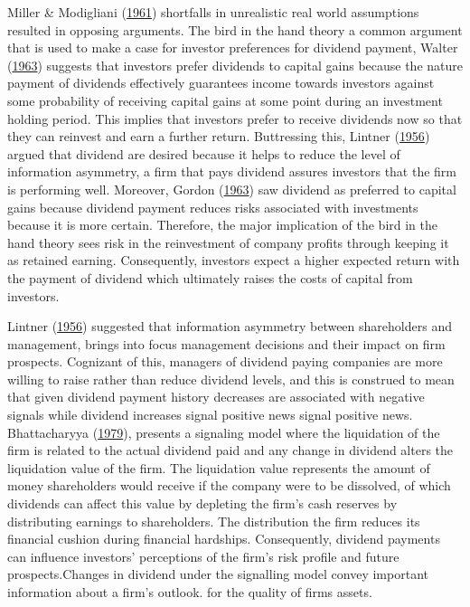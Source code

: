 \documentclass[11pt,preprint, authoryear]{elsarticle}
\numberwithin{equation}{section}
\numberwithin{figure}{section}
\numberwithin{table}{section}
\begin{document}
Miller \& Modigliani (\protect\hyperlink{ref-miller}{1961}) shortfalls
in unrealistic real world assumptions resulted in opposing arguments.
The bird in the hand theory a common argument that is used to make a
case for investor preferences for dividend payment, Walter
(\protect\hyperlink{ref-walter1963dividend}{1963}) suggests that
investors prefer dividends to capital gains because the nature payment
of dividends effectively guarantees income towards investors against
some probability of receiving capital gains at some point during an
investment holding period. This implies that investors prefer to receive
dividends now so that they can reinvest and earn a further return.
Buttressing this, Lintner
(\protect\hyperlink{ref-lintner1956distribution}{1956}) argued that
dividend are desired because it helps to reduce the level of information
asymmetry, a firm that pays dividend assures investors that the firm is
performing well. Moreover, Gordon
(\protect\hyperlink{ref-gordon1963optimal}{1963}) saw dividend as
preferred to capital gains because dividend payment reduces risks
associated with investments because it is more certain. Therefore, the
major implication of the bird in the hand theory sees risk in the
reinvestment of company profits through keeping it as retained earning.
Consequently, investors expect a higher expected return with the payment
of dividend which ultimately raises the costs of capital from investors.

Lintner (\protect\hyperlink{ref-lintner1956distribution}{1956})
suggested that information asymmetry between shareholders and
management, brings into focus management decisions and their impact on
firm prospects. Cognizant of this, managers of dividend paying companies
are more willing to raise rather than reduce dividend levels, and this
is construed to mean that given dividend payment history decreases are
associated with negative signals while dividend increases signal
positive news signal positive news. Bhattacharyya
(\protect\hyperlink{ref-bhattacharyya2007dividend}{1979}), presents a
signaling model where the liquidation of the firm is related to the
actual dividend paid and any change in dividend alters the liquidation
value of the firm. The liquidation value represents the amount of money
shareholders would receive if the company were to be dissolved, of which
dividends can affect this value by depleting the firm's cash reserves by
distributing earnings to shareholders. The distribution the firm reduces
its financial cushion during financial hardships. Consequently, dividend
payments can influence investors' perceptions of the firm's risk profile
and future prospects.Changes in dividend under the signalling model
convey important information about a firm's outlook. for the quality of
firms assets.
\end{document}
